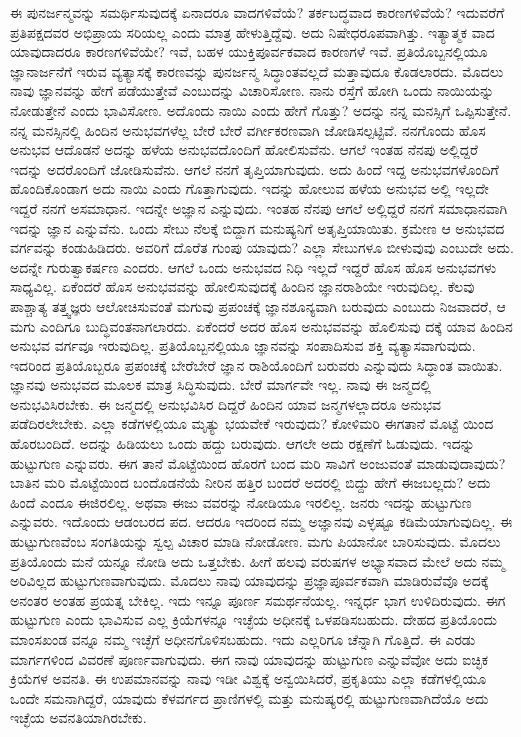 ಈ ಪುನರ್ಜನ್ಮವನ್ನು ಸಮರ್ಥಿಸುವುದಕ್ಕೆ ಏನಾದರೂ ವಾದಗಳಿವೆಯೆ? ತರ್ಕಬದ್ಧವಾದ ಕಾರಣಗಳಿವೆಯೆ? ಇದುವರೆಗೆ ಪ್ರತಿಪಕ್ಷದವರ ಅಭಿಪ್ರಾಯ ಸರಿಯಲ್ಲ ಎಂದು ಮಾತ್ರ ಹೇಳುತ್ತಿದ್ದೆವು. ಅದು ನಿಷೇಧರೂಪವಾಗಿತ್ತು. ಇತ್ಯಾತ್ಮಕ ವಾದ ಯಾವುದಾದರೂ ಕಾರಣಗಳಿವೆಯೇ? ಇವೆ, ಬಹಳ ಯುಕ್ತಿಪೂರ್ವಕವಾದ ಕಾರಣಗಳೆ ಇವೆ. ಪ್ರತಿಯೊಬ್ಬನಲ್ಲಿಯೂ ಜ್ಞಾನಾರ್ಜನೆಗೆ ಇರುವ ವ್ಯತ್ಯಾಸಕ್ಕೆ ಕಾರಣವನ್ನು ಪುನರ್ಜನ್ಮ ಸಿದ್ಧಾಂತವಲ್ಲದೆ ಮತ್ತಾವುದೂ ಕೊಡಲಾರದು. ಮೊದಲು ನಾವು ಜ್ಞಾನವನ್ನು ಹೇಗೆ ಪಡೆಯುತ್ತೇವೆ ಎಂಬುದನ್ನು ವಿಚಾರಿಸೋಣ. ನಾನು ರಸ್ತೆಗೆ ಹೋಗಿ ಒಂದು ನಾಯಿಯನ್ನು ನೋಡುತ್ತೇನೆ ಎಂದು ಭಾವಿಸೋಣ. ಅದೊಂದು ನಾಯಿ ಎಂದು ಹೇಗೆ ಗೊತ್ತು? ಅದನ್ನು ನನ್ನ ಮನಸ್ಸಿಗೆ ಒಪ್ಪಿಸುತ್ತೇನೆ. ನನ್ನ ಮನಸ್ಸಿನಲ್ಲಿ ಹಿಂದಿನ ಅನುಭವಗಳೆಲ್ಲ ಬೇರೆ ಬೇರೆ ವರ್ಗೀಕರಣವಾಗಿ ಜೋಡಿಸಲ್ಪಟ್ಟಿವೆ. ನನಗೊಂದು ಹೊಸ ಅನುಭವ ಆದೊಡನೆ ಅದನ್ನು ಹಳೆಯ ಅನುಭವದೊಂದಿಗೆ ಹೋಲಿಸುವೆನು. ಆಗಲೆ ಇಂತಹ ನೆನಪು ಅಲ್ಲಿದ್ದರೆ ಇದನ್ನು ಅದರೊಂದಿಗೆ ಜೋಡಿಸುವೆನು. ಆಗಲೆ ನನಗೆ ತೃಪ್ತಿಯಾಗುವುದು. ಅದು ಹಿಂದೆ ಇದ್ದ ಅನುಭವಗಳೊಂದಿಗೆ ಹೊಂದಿಕೊಂಡಾಗ ಅದು ನಾಯಿ ಎಂದು ಗೊತ್ತಾಗುವುದು. ಇದನ್ನು ಹೋಲುವ ಹಳೆಯ ಅನುಭವ ಅಲ್ಲಿ ಇಲ್ಲದೇ ಇದ್ದರೆ ನನಗೆ ಅಸಮಾಧಾನ. ಇದನ್ನೇ ಅಜ್ಞಾನ ಎನ್ನುವುದು. ಇಂತಹ ನೆನಪು ಆಗಲೆ ಅಲ್ಲಿದ್ದರೆ ನನಗೆ ಸಮಾಧಾನವಾಗಿ ಇದನ್ನು ಜ್ಞಾನ ಎನ್ನುವೆನು. ಒಂದು ಸೇಬು ನೆಲಕ್ಕೆ ಬಿದ್ದಾಗ ಮನುಷ್ಯನಿಗೆ ಅತೃಪ್ತಿಯಾಯಿತು. ಕ್ರಮೇಣ ಆ ಅನುಭವದ ವರ್ಗವನ್ನು ಕಂಡುಹಿಡಿದರು. ಅವರಿಗೆ ದೊರೆತ ಗುಂಪು ಯಾವುದು? ಎಲ್ಲಾ ಸೇಬುಗಳೂ ಬೀಳುವುವು ಎಂಬುದೇ ಅದು. ಅದನ್ನೇ ಗುರುತ್ವಾಕರ್ಷಣ ಎಂದರು. ಆಗಲೆ ಒಂದು ಅನುಭವದ ನಿಧಿ ಇಲ್ಲದೆ ಇದ್ದರೆ ಹೊಸ ಹೊಸ ಅನುಭವಗಳು ಸಾಧ್ಯವಿಲ್ಲ. ಏಕೆಂದರೆ ಹೊಸ ಅನುಭವವನ್ನು ಹೋಲಿಸುವುದಕ್ಕೆ ಹಿಂದಿನ ಜ್ಞಾನರಾಶಿಯೇ ಇರುವುದಿಲ್ಲ. ಕೆಲವು ಪಾಶ್ಚಾತ್ಯ ತತ್ತ್ವಜ್ಞರು ಆಲೋಚಿಸುವಂತೆ ಮಗುವು ಪ್ರಪಂಚಕ್ಕೆ ಜ್ಞಾನಶೂನ್ಯವಾಗಿ ಬರುವುದು ಎಂಬುದು ನಿಜವಾದರೆ, ಆ ಮಗು ಎಂದಿಗೂ ಬುದ್ಧಿವಂತನಾಗಲಾರದು. ಏಕೆಂದರೆ ಅದರ ಹೊಸ ಅನುಭವವನ್ನು ಹೊಲಿಸುವು ದಕ್ಕೆ ಯಾವ ಹಿಂದಿನ ಅನುಭವ ವರ್ಗವೂ ಇರುವುದಿಲ್ಲ. ಪ್ರತಿಯೊಬ್ಬನಲ್ಲಿಯೂ ಜ್ಞಾನವನ್ನು ಸಂಪಾದಿಸುವ ಶಕ್ತಿ ವ್ಯತ್ಯಾಸವಾಗುವುದು. ಇದರಿಂದ ಪ್ರತಿಯೊಬ್ಬರೂ ಪ್ರಪಂಚಕ್ಕೆ ಬೇರೆಬೇರೆ ಜ್ಞಾನ ರಾಶಿಯೊಂದಿಗೆ ಬರುವರು ಎನ್ನುವುದು ಸಿದ್ಧಾಂತ ವಾಯಿತು. ಜ್ಞಾನವು ಅನುಭವದ ಮೂಲಕ ಮಾತ್ರ ಸಿದ್ಧಿಸುವುದು. ಬೇರೆ ಮಾರ್ಗವೇ ಇಲ್ಲ. ನಾವು ಈ ಜನ್ಮದಲ್ಲಿ ಅನುಭವಿಸಿರಬೇಕು. ಈ ಜನ್ಮದಲ್ಲಿ ಅನುಭವಿಸಿರ ದಿದ್ದರೆ ಹಿಂದಿನ ಯಾವ ಜನ್ಮಗಳಲ್ಲಾದರೂ ಅನುಭವ ಪಡೆದಿರಲೇಬೇಕು. ಎಲ್ಲಾ ಕಡೆಗಳಲ್ಲಿಯೂ ಮೃತ್ಯು ಭಯವೇಕೆ ಇರುವುದು? ಕೋಳಿಮರಿ ಈಗತಾನೆ ಮೊಟ್ಟೆ ಯಿಂದ ಹೊರಬಂದಿದೆ. ಅದನ್ನು ಹಿಡಿಯಲು ಒಂದು ಹದ್ದು ಬರುವುದು. ಆಗಲೇ ಅದು ರಕ್ಷಣೆಗೆ ಓಡುವುದು. ಇದನ್ನು ಹುಟ್ಟುಗುಣ ಎನ್ನುವರು. ಈಗ ತಾನೆ ಮೊಟ್ಟೆಯಿಂದ ಹೊರಗೆ ಬಂದ ಮರಿ ಸಾವಿಗೆ ಅಂಜುವಂತೆ ಮಾಡುವುದಾವುದು? ಬಾತಿನ ಮರಿ ಮೊಟ್ಟೆಯಿಂದ ಬಂದೊಡನೆಯೆ ನೀರಿನ ಹತ್ತಿರ ಬಂದರೆ ಅದರಲ್ಲಿ ಬಿದ್ದು ಹೇಗೆ ಈಜಬಲ್ಲದು? ಅದು ಹಿಂದೆ ಎಂದೂ ಈಜಿರಲಿಲ್ಲ. ಅಥವಾ ಈಜು ವವರನ್ನು ನೋಡಿಯೂ ಇರಲಿಲ್ಲ. ಜನರು ಇದನ್ನು ಹುಟ್ಟುಗುಣ ಎನ್ನುವರು. ಇದೊಂದು ಆಡಂಬರದ ಪದ. ಆದರೂ ಇದರಿಂದ ನಮ್ಮ ಅಜ್ಞಾನವು ಎಳ್ಳಷ್ಟೂ ಕಡಿಮೆಯಾಗುವುದಿಲ್ಲ. ಈ ಹುಟ್ಟುಗುಣವೆಂಬ ಸಂಗತಿಯನ್ನು ಸ್ವಲ್ಪ ವಿಚಾರ ಮಾಡಿ ನೋಡೋಣ. ಮಗು ಪಿಯಾನೋ ಬಾರಿಸುವುದು. ಮೊದಲು ಪ್ರತಿಯೊಂದು ಮನೆ ಯನ್ನೂ ನೋಡಿ ಅದು ಒತ್ತಬೇಕು. ಹೀಗೆ ಹಲವು ವರುಷಗಳ ಅಭ್ಯಾಸವಾದ ಮೇಲೆ ಅದು ನಮ್ಮ ಅರಿವಿಲ್ಲದ ಹುಟ್ಟುಗುಣವಾಗುವುದು. ಮೊದಲು ನಾವು ಯಾವುದನ್ನು ಪ್ರಜ್ಞಾಪೂರ್ವಕವಾಗಿ ಮಾಡಿರುವೆವೊ ಅದಕ್ಕೆ ಅನಂತರ ಅಂತಹ ಪ್ರಯತ್ನ ಬೇಕಿಲ್ಲ. ಇದು ಇನ್ನೂ ಪೂರ್ಣ ಸಮರ್ಥನೆಯಲ್ಲ. ಇನ್ನರ್ಧ ಭಾಗ ಉಳಿದಿರುವುದು. ಈಗ ಹುಟ್ಟುಗುಣ ಎಂದು ಭಾವಿಸುವ ಎಲ್ಲ ಕ್ರಿಯೆಗಳನ್ನೂ ಇಚ್ಛೆಯ ಅಧೀನಕ್ಕೆ ಒಳಪಡಿಸಬಹುದು. ದೇಹದ ಪ್ರತಿಯೊಂದು ಮಾಂಸಖಂಡ ವನ್ನೂ ನಮ್ಮ ಇಚ್ಛೆಗೆ ಅಧೀನಗೊಳಿಸಬಹುದು. ಇದು ಎಲ್ಲರಿಗೂ ಚೆನ್ನಾಗಿ ಗೊತ್ತಿದೆ. ಈ ಎರಡು ಮಾರ್ಗಗಳಿಂದ ವಿವರಣೆ ಪೂರ್ಣವಾಗುವುದು. ಈಗ ನಾವು ಯಾವುದನ್ನು ಹುಟ್ಟುಗುಣ ಎನ್ನುವೆವೋ ಅದು ಐಚ್ಛಿಕ ಕ್ರಿಯೆಗಳ ಅವನತಿ. ಈ ಉಪಮಾನವನ್ನು ನಾವು ಇಡೀ ವಿಶ್ವಕ್ಕೆ ಅನ್ವಯಿಸಿದರೆ, ಪ್ರಕೃತಿಯು ಎಲ್ಲಾ ಕಡೆಗಳಲ್ಲಿಯೂ ಒಂದೇ ಸಮನಾಗಿದ್ದರೆ, ಯಾವುದು ಕೆಳವರ್ಗದ ಪ್ರಾಣಿಗಳಲ್ಲಿ ಮತ್ತು ಮನುಷ್ಯರಲ್ಲಿ ಹುಟ್ಟುಗುಣವಾಗಿದೆಯೊ ಅದು ಇಚ್ಛೆಯ ಅವನತಿಯಾಗಿರಬೇಕು.

